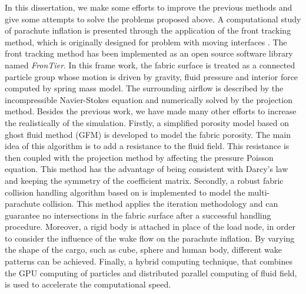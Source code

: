 In this dissertation, we make some efforts to improve the previous methods and 
give some attempts to solve the problems proposed above. 
A computational study of parachute inflation is presented
through the application of the front tracking method, which is originally
designed for problem with moving interfaces \cite{Glimm1998, Tryggvason2001,
Hu2015}. The front tracking method has been implemented as an open source
software library named \textit{FronTier}. In this frame work, the fabric
surface is treated as a connected particle group whose motion is driven by
gravity, fluid pressure and interior force computed by spring mass model. The
surrounding airflow is described by the incompressible Navier-Stokes equation
and numerically solved by the projection method.  Besides the previous work,
we have made many other efforts to increase the realistically of the
simulation. Firstly, a simplified porosity model based on ghost fluid method
(GFM) \cite{Kang2000} is developed to model the fabric porosity. The main idea
of this algorithm is to add a resistance to the fluid field. This resistance is
then coupled with the projection method by affecting the pressure Poisson
equation. This method has the advantage of being consistent with Darcy's law
and keeping the symmetry of the coefficient matrix. Secondly, a robust fabric
collision handling algorithm based on \cite{Bridson2005} is implemented to
model the multi-parachute collision. This method applies the iteration
methodology and can guarantee no intersections in the fabric surface after a
successful handling procedure. Moreover, a rigid body is attached in place of
the load node, in order to consider the influence of the wake flow on the
parachute inflation. By varying the shape of the cargo, such as cube, sphere
and human body, different wake patterns can be achieved. Finally, a hybrid
computing technique, that combines the GPU computing of particles and
distributed parallel computing of fluid field, is used to accelerate the
computational speed.

